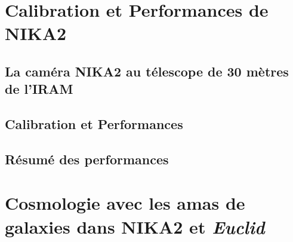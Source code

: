 \documentclass[a4paper, 12pt]{report}
\begin{document}
%
%
%
%
%
%
%

\part{Calibration et Performances de NIKA2}
%
%   
%
\chapter{La caméra NIKA2 au télescope de 30 mètres de l'IRAM}
\label{chap:nika2iram}

%
%   
%
\chapter{Calibration et Performances}
\label{chap:calib_perf}


%
%   
%
\chapter{Résumé des performances}
\label{chap:nika2_resume}


%
%
%
%
%
%
%

\part{Cosmologie avec les amas de galaxies dans NIKA2 et \emph{Euclid}}

%
%
\end{document}
